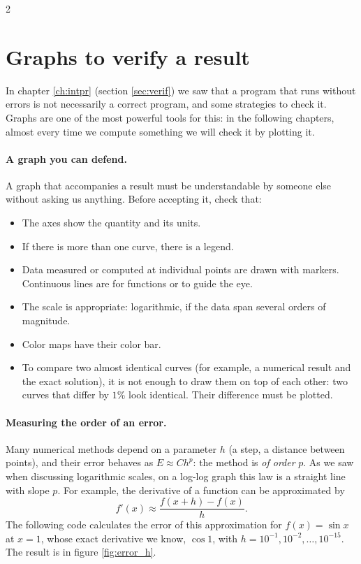\begin{paracol}{2}
\section[Graphs to verify a result]{Graphs to verify a result}\label{sec:graf_verif-2}
In chapter \ref{ch:intpr} (section \ref{sec:verif}) we saw that a program that runs without errors is not necessarily a correct program, and some strategies to check it. Graphs are one of the most powerful tools for this: in the following chapters, almost every time we compute something we will check it by plotting it.

\paragraph{A graph you can defend.} A graph that accompanies a result must be understandable by someone else without asking us anything. Before accepting it, check that:
\begin{itemize}
\item The axes show the quantity and its units.
\item If there is more than one curve, there is a legend.
\item Data measured or computed at individual points are drawn with markers. Continuous lines are for functions or to guide the eye.
\item The scale is appropriate: logarithmic, if the data span several orders of magnitude.
\item Color maps have their color bar.
\item To compare two almost identical curves (for example, a numerical result and the exact solution), it is not enough to draw them on top of each other: two curves that differ by $1\%$ look identical. Their difference must be plotted.
\end{itemize}

\paragraph{Measuring the order of an error.} Many numerical methods depend on a parameter $h$ (a step, a distance between points), and their error behaves as $E\approx Ch^p$: the method is \emph{of order} $p$. As we saw when discussing logarithmic scales, on a log-log graph this law is a straight line with slope $p$. For example, the derivative of a function can be approximated by
$$f'(x)\approx\frac{f(x+h)-f(x)}{h}.$$
The following code calculates the error of this approximation for $f(x)=\sin x$ at $x=1$, whose exact derivative we know, $\cos 1$, with $h=10^{-1}, 10^{-2},\ldots,10^{-15}$. The result is in figure \ref{fig:error_h}.
\end{paracol}
